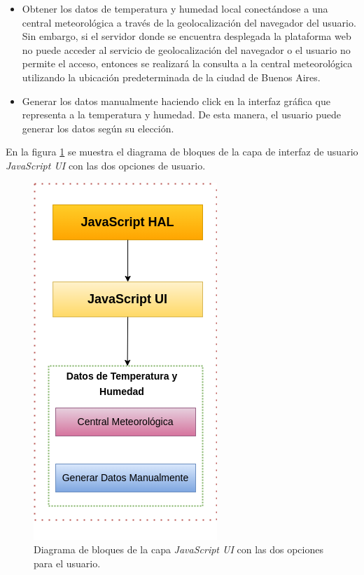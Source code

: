  \begin{itemize}
	\item Obtener los datos de temperatura y humedad local conectándose a una central meteorológica a través de la geolocalización del navegador del usuario. Sin embargo, si el servidor donde se encuentra desplegada la plataforma web no puede acceder al servicio de geolocalización del navegador o el usuario no permite el acceso, entonces se realizará la consulta a la central meteorológica utilizando la ubicación predeterminada de la ciudad de Buenos Aires.
	
	\item Generar los datos manualmente haciendo click en la interfaz gráfica que representa a la temperatura y humedad. De esta manera, el usuario puede generar los datos según su elección.
\end{itemize}

En la figura \ref{fig:uiDht11} se muestra el diagrama de bloques de la capa de interfaz de usuario \textit{JavaScript UI} con las dos opciones de usuario.

\begin{figure}[ht]
	\centering
	\includegraphics[scale=.57]{./Figures/uiDht11.png}
	\caption{Diagrama de bloques de la capa \textit{JavaScript UI} con las dos opciones para el usuario.}
	\label{fig:uiDht11}
\end{figure}


